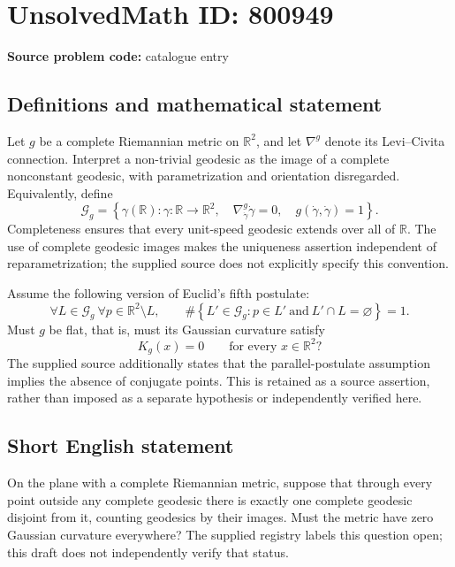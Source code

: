 \documentclass[11pt]{article}
\newcommand{\R}{\mathbb{R}}
\begin{document}
\section*{UnsolvedMath ID: 800949}
\textbf{Source problem code:} catalogue entry
\subsection{Definitions and mathematical statement}
Let \(g\) be a complete Riemannian metric on \(\R^2\), and let \(\nabla^g\) denote its Levi--Civita connection. Interpret a non-trivial geodesic as the image of a complete nonconstant geodesic, with parametrization and orientation disregarded. Equivalently, define
\[
\mathcal{G}_g=\left\{\gamma(\R):\gamma:\R\longrightarrow\R^2,\quad \nabla^g_{\dot\gamma}\dot\gamma=0,\quad g(\dot\gamma,\dot\gamma)=1\right\}.
\]
Completeness ensures that every unit-speed geodesic extends over all of \(\R\). The use of complete geodesic images makes the uniqueness assertion independent of reparametrization; the supplied source does not explicitly specify this convention.

Assume the following version of Euclid's fifth postulate:
\[
\forall L\in\mathcal{G}_g\ \forall p\in\R^2\setminus L,\qquad
\#\left\{L'\in\mathcal{G}_g:p\in L'\ \text{and}\ L'\cap L=\varnothing\right\}=1.
\]
Must \(g\) be flat, that is, must its Gaussian curvature satisfy
\[
K_g(x)=0\qquad\text{for every }x\in\R^2?
\]
The supplied source additionally states that the parallel-postulate assumption implies the absence of conjugate points. This is retained as a source assertion, rather than imposed as a separate hypothesis or independently verified here.
\subsection{Short English statement}
On the plane with a complete Riemannian metric, suppose that through every point outside any complete geodesic there is exactly one complete geodesic disjoint from it, counting geodesics by their images. Must the metric have zero Gaussian curvature everywhere? The supplied registry labels this question open; this draft does not independently verify that status.
\end{document}
